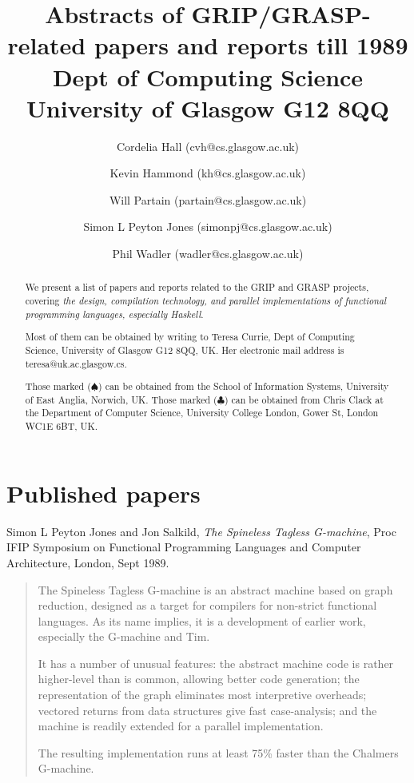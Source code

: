 
\newcommand{\reference}[4]{	%
\large
#1, {\em #2}, #3.
\normalsize
\begin{quotation}
#4
\end{quotation}
\vspace{0.2in}
}

\newcommand{\Haskell}[1]{{\sc Haskell}}



\title{Abstracts of GRIP/GRASP-related papers and reports till 1989\\
Dept of Computing Science \\
University of Glasgow G12 8QQ}

\author{
Cordelia Hall (cvh@cs.glasgow.ac.uk) \and
Kevin Hammond (kh@cs.glasgow.ac.uk) \and
Will Partain (partain@cs.glasgow.ac.uk) \and
Simon L Peyton Jones (simonpj@cs.glasgow.ac.uk) \and
Phil Wadler (wadler@cs.glasgow.ac.uk) 
}

\maketitle

\begin{abstract}
We present a list of papers and reports related to the GRIP 
and GRASP projects,
covering {\em the design, compilation technology,
and parallel implementations of functional programming languages, especially
\Haskell{}}.

Most of them can be obtained by writing to 
Teresa Currie, Dept of Computing Science,
University of Glasgow G12 8QQ, UK.   Her electronic mail address is
teresa@uk.ac.glasgow.cs.

Those marked ($\spadesuit$) can be obtained from the School of Information
Systems, University of East Anglia, Norwich, UK.
Those marked ($\clubsuit$) can be obtained from Chris Clack at the
Department of Computer Science, University College London, Gower St, 
London WC1E 6BT, UK.
\end{abstract}

\section{Published papers}

\reference{Simon L Peyton Jones and Jon Salkild}
{The Spineless Tagless G-machine}
{Proc IFIP Symposium on Functional Programming Languages and Computer
Architecture, London, Sept 1989}
{
The Spineless Tagless G-machine is an abstract machine based on graph
reduction, designed as a target for compilers for non-strict functional
languages.
As its name implies, it is a development of earlier work, especially
the G-machine and Tim.

It has a number of unusual features: the abstract machine code is
rather higher-level than is common, allowing better code generation;
the representation of the graph eliminates most interpretive overheads;
vectored returns from data structures give fast case-analysis;
and the machine is readily extended for a parallel implementation.

The resulting implementation runs at least 75\% faster 
than the Chalmers G-machine.
}


